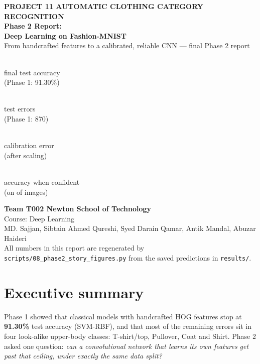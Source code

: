 \documentclass[11pt,a4paper]{article}
\newcommand{\stat}[2]{\begin{minipage}[t]{0.23\linewidth}\centering{\fontsize{24}{26}\selectfont\bfseries\color{violet}#1}\\[2pt]{\small\color{muted}#2}\end{minipage}}
\begin{document}
\begin{titlepage}
\vspace*{2.5cm}
{\color{violet}\large\bfseries PROJECT 11 \textperiodcentered{} AUTOMATIC CLOTHING CATEGORY RECOGNITION}\\[0.6cm]
{\fontsize{30}{36}\selectfont\bfseries\color{ink} Phase 2 Report:\\[4pt] Deep Learning on Fashion-MNIST}\\[0.5cm]
{\Large\color{muted} From handcrafted features to a calibrated, reliable CNN --- final Phase 2 report}\\[2cm]

\stat{\FinalAcc}{final test accuracy\\(Phase 1: 91.30\%)}\hfill
\stat{\FinalErr}{test errors\\(Phase 1: 870)}\hfill
\stat{\EceAfter}{calibration error\\(after scaling)}\hfill
\stat{\AbsAcc}{accuracy when confident\\(on \AbsCov{} of images)}

\vfill
{\color{ink}\bfseries Team T002 \textperiodcentered{} Newton School of Technology}\\
{\color{muted}Course: Deep Learning}\\
{\color{muted}MD. Sajjan, Sibtain Ahmed Qureshi, Syed Darain Qamar, Antik Mandal, Abuzar Haideri}\\[0.3cm]
{\small\color{muted}All numbers in this report are regenerated by \texttt{scripts/08\_phase2\_story\_figures.py} from the saved predictions in \texttt{results/}.}
\end{titlepage}

\tableofcontents
\newpage

\section{Executive summary}

Phase 1 showed that classical models with handcrafted HOG features stop at \textbf{91.30\%} test accuracy
(SVM-RBF), and that most of the remaining errors sit in four look-alike upper-body classes:
T-shirt/top, Pullover, Coat and Shirt. Phase 2 asked one question: \emph{can a convolutional network
that learns its own features get past that ceiling, under exactly the same data split?}
\end{document}
